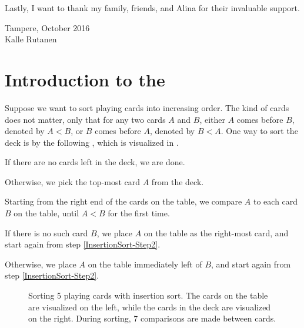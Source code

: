\documentclass[b5paper, english, oneside]{memoir}
\begin{document}
Lastly, I want to thank my family, friends, and Alina for their invaluable support.

\bigskip
\begin{flushright}
Tampere, October 2016 \\
\vspace{1.5cm}
Kalle Rutanen
\end{flushright}

\newpage 
\tableofcontents
\newpage 

\mainmatter

\chapter{Introduction to the \manuscript{}}
\label{Introduction}

Suppose we want to sort playing cards into increasing order. The kind of cards does not matter, only that for any two cards $A$ and $B$, either $A$ comes before $B$, denoted by $A < B$, or $B$ comes before $A$, denoted by $B < A.$ One way to sort the deck is by the following , which is visualized in .

\begin{enumbox}
\item\label{InsertionSort-Step2} If there are no cards left in the deck, we are done.
\item\label{InsertionSort-Step3} Otherwise, we pick the top-most card $A$ from the deck.
\item\label{InsertionSort-Step4} Starting from the right end of the cards on the table, we compare $A$ to each card $B$ on the table, until $A < B$ for the first time.
\item\label{InsertionSort-Step5} If there is no such card $B$, we place $A$ on the table as the right-most card, and start again from step \ref{InsertionSort-Step2}.
\item\label{InsertionSort-Step6} Otherwise, we place $A$ on the table immediately left of $B$, and start again from step \ref{InsertionSort-Step2}.
\end{enumbox}

\begin{figure}
\centering
{} \hfill
{}

 \hfill
{}

 \hfill
{}

\caption{Sorting 5 playing cards with insertion sort. The cards on the table are visualized on the left, while the cards in the deck are visualized on the right. During sorting, 7 comparisons are made between cards.}
\label{InsertionSortExample}
\end{figure}
\end{document}
